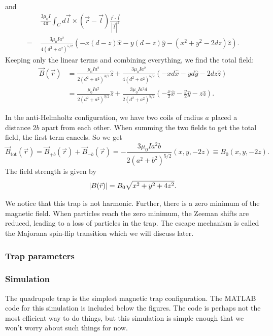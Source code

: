 \documentclass{book}
\theoremstyle{definition}
\newcommand{\f}[2]{\frac{#1}{#2}}
\begin{document}
and 
\begin{align*}
&\f{3\mu_0 I }{4\pi}\int_C d\vec{l}\times (\vec{r} - \vec{l}) \f{\vec{r}\cdot \vec{l}}{|\vec{l}|^5}\\ 
=\,\, &\f{3\mu_0 Ia^2}{4(d^2+a^2)^{5/2}} \left(- x(d-z)\hat{x}  - y (d-z)\hat{y} -  (x^2 + y^2 - 2dz)\hat{z}\right).
\end{align*}
Keeping only the linear terms and combining everything, we find the total field:
\begin{align*}
\vec{B}(\vec{r}) &= \f{\mu_0 I a^2}{2(d^2 + a^2)^{3/2}} \hat{z} + \f{3\mu_0 Ia^2}{4(d^2+a^2)^{5/2}} \left(- xd\hat{x}  -  y d\hat{y} - 2dz\hat{z}\right)\\
&= \f{\mu_0 I a^2}{2(d^2 + a^2)^{3/2}} \hat{z} + \f{3\mu_0 Ia^2 d}{2(d^2+a^2)^{5/2}} \left(- \f{x}{2}\hat{x}  -  \f{y}{2}\hat{y} - z\hat{z}\right).
\end{align*}






In the anti-Helmholtz configuration, we have two coils of radius $a$ placed a distance $2b$ apart from each other. When summing the two fields to get the total field, the first term cancels. So we get
\begin{equation*}
\vec{B}_\text{tot}(\vec{r}) = \vec{B}_{+b}(\vec{r}) + \vec{B}_{-b}(\vec{r}) = -\f{3\mu_0 I a^2 b}{2(a^2 + b^2)^{5/2}}\left( x,y,-2z \right) \equiv B_0 (x,y,-2z).
\end{equation*}
The field strength is given by 
\begin{equation*}
\abs{B(\vec{r})} = B_0 \sqrt{x^2 + y^2 + 4z^2}.
\end{equation*}

We notice that this trap is not harmonic. Further, there is a zero minimum of the magnetic field. When particles reach the zero minimum, the Zeeman shifts are reduced, leading to a loss of particles in the trap. The escape mechanism is called the Majorana spin-flip transition which we will discuss later. 


\subsubsection*{Trap parameters}

\subsubsection*{Simulation}


The quadrupole trap is the simplest magnetic trap configuration. The MATLAB code for this simulation is included below the figures. The code is perhaps not the most efficient way to do things, but this simulation is simple enough that we won't worry about such things for now. 
\end{document}
